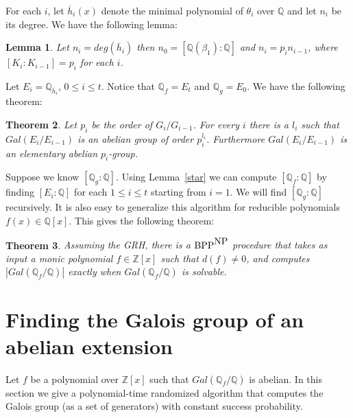 \documentclass{article}
\newtheorem{theorem}{Theorem}[section]
\newtheorem{lemma}[theorem]{Lemma}
\newcommand{\Gal}[1]{\ensuremath{Gal\left(#1\right)}}
\newcommand{\Q}[0]{\ensuremath{\mathbb{Q}}}
\newcommand{\Z}[0]{\ensuremath{\mathbb{Z}}}
\newcommand{\BPP}{\mbox{\rm BPP}}
\newcommand{\NP}{\mbox{\rm NP}}
\begin{document}
For each $i$, let $\overline{h}_i(x)$ denote the minimal polynomial of
$\theta_i$ over $\Q$ and let $n_i$ be its degree. We have the
following lemma:

\begin{lemma}
  Let $n_i = deg(\overline{h}_i)$ then $n_0 = [\Q(\beta_1):\Q]$ and
  $n_i = p_i n_{i-1}$, where $[K_i:K_{i-1}]=p_i$ for each $i$.
\end{lemma}

Let $E_i=\Q_{\overline{h}_i}$, $0\leq i\leq t$. Notice that $\Q_f =
E_t$ and $\Q_g = E_0$. We have the following theorem:

\begin{theorem}\label{main:theorem}
  Let $p_i$ be the order of $G_i/G_{i-1}$.  For every $i$ there is a
  $l_i$ such that $\Gal{E_i/E_{i-1}}$ is an abelian group of order
  $p_i^{l_i}$. Furthermore $\Gal{E_i/E_{i-1}}$ is an elementary
  abelian $p_i$-group.
\end{theorem}

Suppose we know $[\Q_g : \Q]$. Using Lemma~\ref{star} we can compute
$[\Q_f:\Q]$ by finding $[E_i :\Q]$ for each $1 \leq i \leq t$ starting
from $i = 1$.  We will find $[\Q_g :\Q]$ recursively. It is also easy
to generalize this algorithm for reducible polynomials $f(x) \in
\Q[x]$.  This gives the following theorem:

\begin{theorem}\label{second}
  Assuming the GRH, there is a $\BPP^{\NP}$ procedure that takes as
  input a monic polynomial $f\in\Z[x]$ such that $d(f)\neq 0$,
  and computes $|\Gal{\Q_f/\Q}|$ exactly when $\Gal{\Q_f/\Q}$ is
  solvable.
\end{theorem}

\section{Finding the Galois group of an abelian extension}\label{sect:abel}

Let $f$ be a polynomial over $\Z[x]$ such that $\Gal{\Q_f/\Q}$ is
abelian. In this section we give a polynomial-time randomized
algorithm that computes the Galois group (as a set of generators) with
constant success probability.
\end{document}
